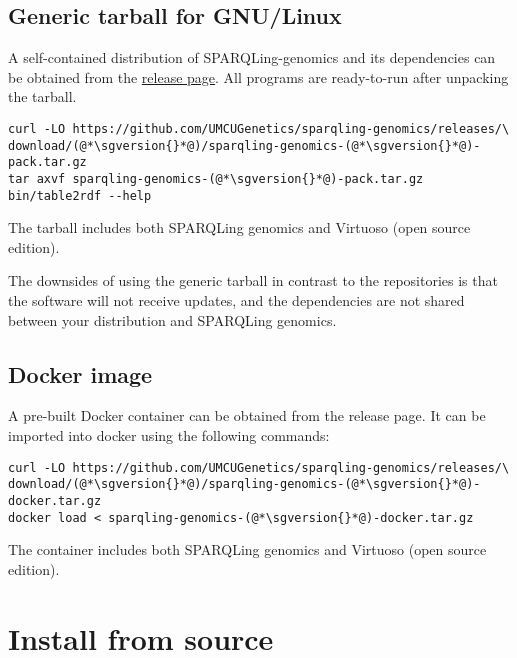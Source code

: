 \subsection{Generic tarball for GNU/Linux}

  A self-contained distribution of SPARQLing-genomics and its dependencies
  can be obtained from the \href{https://github.com/UMCUGenetics/sparqling-genomics/releases}%
  {release page}.  All programs are ready-to-run after unpacking the tarball.

\begin{siderules}
\begin{lstlisting}
curl -LO https://github.com/UMCUGenetics/sparqling-genomics/releases/\
download/(@*\sgversion{}*@)/sparqling-genomics-(@*\sgversion{}*@)-pack.tar.gz
tar axvf sparqling-genomics-(@*\sgversion{}*@)-pack.tar.gz
bin/table2rdf --help
\end{lstlisting}
\end{siderules}

  The tarball includes both SPARQLing genomics and Virtuoso (open source
  edition).

  The downsides of using the generic tarball in contrast to the repositories is
  that the software will not receive updates, and the dependencies are not
  shared between your distribution and SPARQLing genomics.

\subsection{Docker image}

  A pre-built Docker container can be obtained from the release page.  It
  can be imported into docker using the following commands:

\begin{siderules}
\begin{lstlisting}
curl -LO https://github.com/UMCUGenetics/sparqling-genomics/releases/\
download/(@*\sgversion{}*@)/sparqling-genomics-(@*\sgversion{}*@)-docker.tar.gz
docker load < sparqling-genomics-(@*\sgversion{}*@)-docker.tar.gz
\end{lstlisting}
\end{siderules}

  The container includes both SPARQLing genomics and Virtuoso (open source
  edition).

\section{Install from source}
\label{sec:source-installation}


